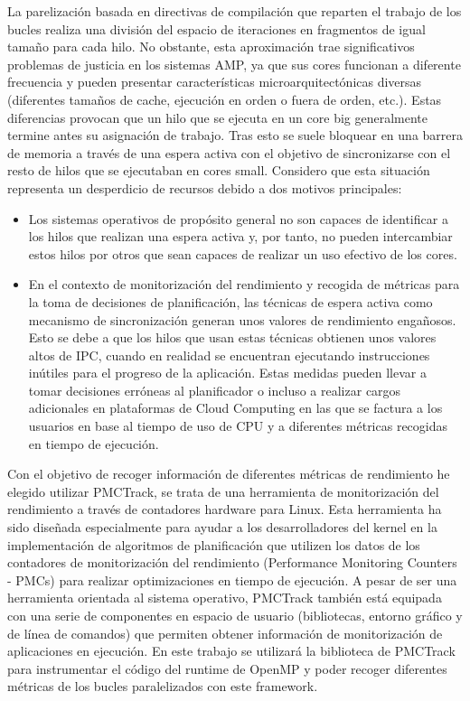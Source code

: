 La parelización basada en directivas de compilación que reparten el trabajo de los bucles realiza una división del espacio de iteraciones en fragmentos de igual tamaño para cada hilo. No obstante, esta aproximación trae significativos problemas de justicia en los sistemas AMP, ya que sus cores funcionan a diferente frecuencia y pueden presentar características microarquitectónicas diversas (diferentes tamaños de cache, ejecución en orden o fuera de orden, etc.). Estas diferencias provocan que un hilo que se ejecuta en un core big generalmente termine antes su asignación de trabajo. Tras esto se suele bloquear en una barrera de memoria a través de una espera activa con el objetivo de sincronizarse con el resto de hilos que se ejecutaban en cores small. Considero que esta situación representa un desperdicio de recursos debido a dos motivos principales:

\begin{itemize}
	\item Los sistemas operativos de propósito general no son capaces de identificar a los hilos que realizan una espera activa y, por tanto, no pueden intercambiar estos hilos por otros que sean capaces de realizar un uso efectivo de los cores.
	\item En el contexto de monitorización del rendimiento y recogida de métricas para la toma de decisiones de planificación, las técnicas de espera activa como mecanismo de sincronización generan unos valores de rendimiento engañosos. Esto se debe a que los hilos que usan estas técnicas obtienen unos valores altos de IPC, cuando en realidad se encuentran ejecutando instrucciones inútiles para el progreso de la aplicación. Estas medidas pueden llevar a tomar decisiones erróneas al planificador o incluso a realizar cargos adicionales en plataformas de Cloud Computing en las que se factura a los usuarios en base al tiempo de uso de CPU y a diferentes métricas recogidas en tiempo de ejecución.
\end{itemize}


Con el objetivo de recoger información de diferentes métricas de rendimiento he elegido utilizar PMCTrack, se trata de una herramienta de monitorización del rendimiento a través de contadores hardware para Linux. Esta herramienta ha sido diseñada especialmente para ayudar a los desarrolladores del kernel en la implementación de algoritmos de planificación que utilizen los datos de los contadores de monitorización del rendimiento (Performance Monitoring Counters - PMCs) para realizar optimizaciones en tiempo de ejecución. A pesar de ser una herramienta orientada al sistema operativo, PMCTrack también está equipada con una serie de componentes en espacio de usuario (bibliotecas, entorno gráfico y de línea de comandos) que permiten obtener información de monitorización de aplicaciones en ejecución. En este trabajo se utilizará la biblioteca de PMCTrack para instrumentar el código del runtime de OpenMP y poder recoger diferentes métricas de los bucles paralelizados con este framework.

